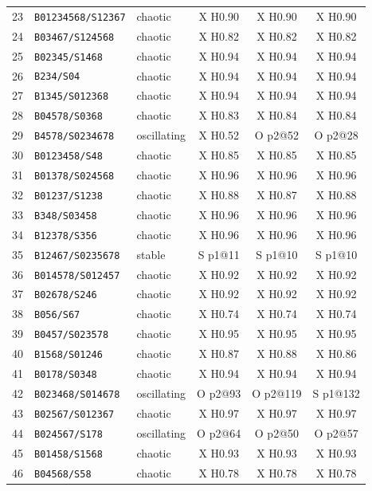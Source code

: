 {\begin{longtable}{@{}rllccc@{}}
23 & \texttt{B01234568/S12367} & chaotic & X H0.90 & X H0.90 & X H0.90 \\
24 & \texttt{B03467/S124568} & chaotic & X H0.82 & X H0.82 & X H0.82 \\
25 & \texttt{B02345/S1468} & chaotic & X H0.94 & X H0.94 & X H0.94 \\
26 & \texttt{B234/S04} & chaotic & X H0.94 & X H0.94 & X H0.94 \\
27 & \texttt{B1345/S012368} & chaotic & X H0.94 & X H0.94 & X H0.94 \\
28 & \texttt{B04578/S0368} & chaotic & X H0.83 & X H0.84 & X H0.84 \\
29 & \texttt{B4578/S0234678} & oscillating & X H0.52 & O p2@52 & O p2@28 \\
30 & \texttt{B0123458/S48} & chaotic & X H0.85 & X H0.85 & X H0.85 \\
31 & \texttt{B01378/S024568} & chaotic & X H0.96 & X H0.96 & X H0.96 \\
32 & \texttt{B01237/S1238} & chaotic & X H0.88 & X H0.87 & X H0.88 \\
33 & \texttt{B348/S03458} & chaotic & X H0.96 & X H0.96 & X H0.96 \\
34 & \texttt{B12378/S356} & chaotic & X H0.96 & X H0.96 & X H0.96 \\
35 & \texttt{B12467/S0235678} & stable & S p1@11 & S p1@10 & S p1@10 \\
36 & \texttt{B014578/S012457} & chaotic & X H0.92 & X H0.92 & X H0.92 \\
37 & \texttt{B02678/S246} & chaotic & X H0.92 & X H0.92 & X H0.92 \\
38 & \texttt{B056/S67} & chaotic & X H0.74 & X H0.74 & X H0.74 \\
39 & \texttt{B0457/S023578} & chaotic & X H0.95 & X H0.95 & X H0.95 \\
40 & \texttt{B1568/S01246} & chaotic & X H0.87 & X H0.88 & X H0.86 \\
41 & \texttt{B0178/S0348} & chaotic & X H0.94 & X H0.94 & X H0.94 \\
42 & \texttt{B023468/S014678} & oscillating & O p2@93 & O p2@119 & S p1@132 \\
43 & \texttt{B02567/S012367} & chaotic & X H0.97 & X H0.97 & X H0.97 \\
44 & \texttt{B024567/S178} & oscillating & O p2@64 & O p2@50 & O p2@57 \\
45 & \texttt{B01458/S1568} & chaotic & X H0.93 & X H0.93 & X H0.93 \\
46 & \texttt{B04568/S58} & chaotic & X H0.78 & X H0.78 & X H0.78 \\

\end{longtable}}
